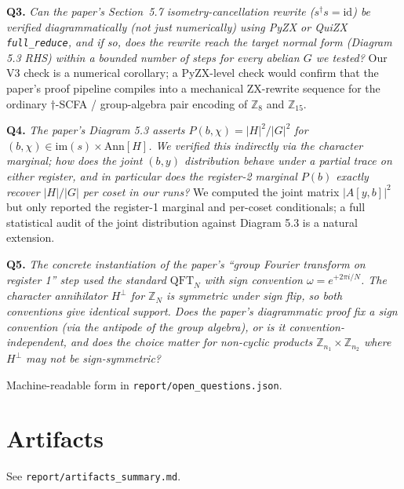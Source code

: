 \documentclass[11pt]{article}
\begin{document}
\textbf{Q3.} \emph{Can the paper's Section~5.7 isometry-cancellation rewrite ($s^\dagger s = \mathrm{id}$)
be verified \emph{diagrammatically} (not just numerically) using PyZX or QuiZX \texttt{full\_reduce},
and if so, does the rewrite reach the target normal form (Diagram 5.3 RHS) within a bounded
number of steps for every abelian $G$ we tested?} Our V3 check is a numerical corollary; a
PyZX-level check would confirm that the paper's proof pipeline compiles into a mechanical
ZX-rewrite sequence for the ordinary $\dagger$-SCFA / group-algebra pair encoding of
$\mathbb{Z}_8$ and $\mathbb{Z}_{15}$.

\textbf{Q4.} \emph{The paper's Diagram 5.3 asserts $P(b, \chi) = |H|^2/|G|^2$ for
$(b, \chi) \in \mathrm{im}(s) \times \mathrm{Ann}[H]$. We verified this indirectly via the
character marginal; how does the joint $(b,y)$ distribution behave under a partial trace on
either register, and in particular does the register-2 marginal $P(b)$ exactly recover
$|H|/|G|$ per coset in our runs?} We computed the joint matrix $|A[y,b]|^2$ but only
reported the register-1 marginal and per-coset conditionals; a full statistical audit of
the joint distribution against Diagram 5.3 is a natural extension.

\textbf{Q5.} \emph{The concrete instantiation of the paper's ``group Fourier transform on
register 1'' step used the standard $\mathrm{QFT}_N$ with sign convention
$\omega = e^{+2\pi i /N}$. The character annihilator $H^\perp$ for $\mathbb{Z}_N$ is symmetric
under sign flip, so both conventions give identical support. Does the paper's diagrammatic
proof \emph{fix} a sign convention (via the antipode of the group algebra), or is it
convention-independent, and does the choice matter for non-cyclic products
$\mathbb{Z}_{n_1} \times \mathbb{Z}_{n_2}$ where $H^\perp$ may not be sign-symmetric?}

Machine-readable form in \texttt{report/open\_questions.json}.

\section*{Artifacts}
See \texttt{report/artifacts\_summary.md}.
\end{document}
